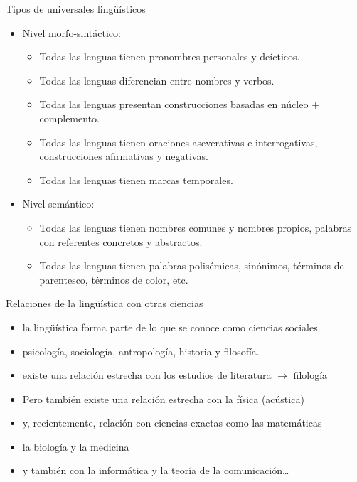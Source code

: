 \documentclass[handout]{beamer}
\begin{document}
\begin{frame}{Tipos de universales lingüísticos}

\begin{itemize}
	\item Nivel morfo-sintáctico: 
	\begin{itemize}
		\item Todas las lenguas tienen pronombres personales y deícticos.
		\item Todas las lenguas diferencian entre nombres y verbos.
		\item Todas las lenguas presentan construcciones basadas en núcleo + complemento.
		\item Todas las lenguas tienen oraciones aseverativas e interrogativas, construcciones
afirmativas y negativas. 
		\item Todas las lenguas tienen marcas temporales.
	\end{itemize} 
		  
	\item Nivel semántico: 
	\begin{itemize}
		\item Todas las lenguas tienen nombres comunes y nombres propios, palabras con
referentes concretos y abstractos. 
 		\item Todas las lenguas tienen palabras polisémicas, sinónimos, términos de parentesco, términos de color, etc.
	\end{itemize}
\end{itemize}

\end{frame}

\begin{frame}{Relaciones de la lingüística con otras ciencias}

\begin{itemize}
	\item la lingüística forma parte de lo que se conoce como ciencias sociales. 
	\item psicología, sociología, antropología, historia y filosofía. 
	\item existe una relación estrecha con los estudios de literatura $\rightarrow$ filología
	\item Pero también existe una relación estrecha con la física (acústica)
	\item y, recientemente, relación con ciencias exactas como las matemáticas
	\item la biología y la medicina
	\item y también con la informática y la teoría de la comunicación\ldots
\end{itemize}

\end{frame}
\end{document}
